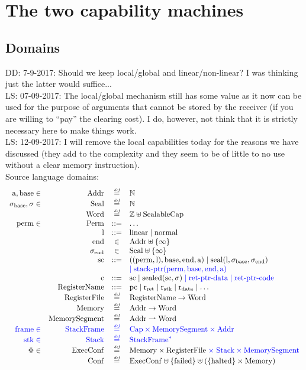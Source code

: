 \documentclass[a4paper]{article}
\newcommand\lau[1]{{\color{purple} \sf \footnotesize {LS: #1}}\\}
\newcommand\dominique[1]{{\color{purple} \sf \footnotesize {DD: #1}}\\}
\newcommand{\defeq}{\stackrel{\textit{\tiny{def}}}{=}}
\newcommand{\defbnf}{::=}
\newcommand{\fun}{\rightarrow}
\newcommand{\parfun}{\rightharpoonup}
\newcommand{\sourcecolor}[1]{\color{blue}}
\newcommand{\src}[1]{{\sourcecolor{} #1}}
\newcommand{\nats}{\mathbb{N}}
\newcommand{\ints}{\mathbb{Z}}
\newcommand{\shareddom}[1]{\mathrm{#1}}
\newcommand{\RegName}{\shareddom{RegisterName}}
\newcommand{\Addr}{\shareddom{Addr}}
\newcommand{\Seal}{\shareddom{Seal}}
\newcommand{\Perm}{\shareddom{Perm}}
\newcommand{\Caps}{\shareddom{Cap}}
\newcommand{\SealableCaps}{\shareddom{SealableCap}}
\newcommand{\Word}{\shareddom{Word}}
\newcommand{\Mem}{\shareddom{Memory}}
\newcommand{\Reg}{\shareddom{RegisterFile}}
\newcommand{\Conf}{\shareddom{Conf}}
\newcommand{\ExecConf}{\shareddom{ExecConf}}
\newcommand{\MemSeg}{\shareddom{MemorySegment}}
\newcommand{\StkFrame}{\shareddom{StackFrame}}
\newcommand{\Stack}{\shareddom{Stack}}
\newcommand{\scbnf}{\shareddom{sc}}
\newcommand{\cbnf}{\shareddom{c}}
\newcommand{\permbnf}{\shareddom{perm}}
\newcommand{\addrbnf}{\shareddom{a}}
\newcommand{\basebnf}{\shareddom{base}}
\newcommand{\aendbnf}{\shareddom{end}}
\newcommand{\linbnf}{\shareddom{l}}
\newcommand{\sealbasebnf}{\sigma_\shareddom{base}}
\newcommand{\sealendbnf}{\sigma_\shareddom{end}}
\newcommand{\sstk}{\shareddom{stk}}
\newcommand{\sstkframe}{\shareddom{frame}}
\newcommand{\stkptr}[1]{\mathrm{stack\text{-}ptr}(#1)}
\newcommand{\retptrd}{\mathrm{ret\text{-}ptr\text{-}data}}
\newcommand{\retptrc}{\mathrm{ret\text{-}ptr\text{-}code}}
\newcommand{\seal}[1]{\shareddom{seal}(#1)}
\newcommand{\sealed}[1]{\shareddom{sealed}(#1)}
\newcommand{\failed}{\mathrm{failed}}
\newcommand{\halted}{\mathrm{halted}}
\newcommand{\pcreg}{\mathrm{pc}}
\newcommand{\rstk}{\mathrm{r}_\mathrm{stk}}
\newcommand{\rO}{\mathrm{r}_\mathrm{ret}}
\newcommand{\rret}{\rO}
\newcommand{\rdata}{\mathrm{r}_\mathrm{data}}
\newcommand{\plainlinearity}[1]{\mathrm{#1}}
\newcommand{\linear}{\plainlinearity{linear}}
\newcommand{\normal}{\plainlinearity{normal}}
\begin{document}
\section{The two capability machines}
\subsection{Domains}
\label{sec:domains}

\dominique{7-9-2017: Should we keep local/global and linear/non-linear?  I was thinking just the latter would suffice...}
\lau{07-09-2017: The local/global mechanism still has some value as it now can be used for the purpose of arguments that cannot be stored by the receiver (if you are willing to ``pay'' the clearing cost). I do, however, not think that it is strictly necessary here to make things work.}
\lau{12-09-2017: I will remove the local capabilities today for the reasons we have discussed (they add to the complexity and they seem to be of little to no use without a clear memory instruction).}
Source language domains:
\[
  \begin{array}{rrcl}
   \addrbnf,\basebnf \in & \Addr & \defeq & \nats \\
    \sealbasebnf, \sigma \in & \Seal & \defeq & \nats \\
    &\Word & \defeq & \ints \uplus \SealableCaps\\
    \permbnf \in& \Perm & \defbnf & \dots \\
    &\linbnf & \defbnf & \linear \mid \normal \\
    &\aendbnf & \in & \Addr \uplus \{\infty \} \\
    &\sealendbnf & \in & \Seal \uplus \{\infty \} \\
    &\scbnf &\defbnf & ((\permbnf,\linbnf),\basebnf,\aendbnf,\addrbnf) \mid \seal{\linbnf,\sealbasebnf,\sealendbnf}\\
    & & & {\sourcecolor{} \mid \stkptr{\permbnf,\basebnf,\aendbnf,\addrbnf}}\\ 
    &\cbnf & \defbnf &  \scbnf \mid \sealed{\scbnf,\sigma}{\sourcecolor{} \; \mid \retptrd \mid \retptrc}\\ 
    &\RegName & \defbnf &\pcreg \mid \rret \mid \rstk \mid \rdata \mid \dots \\
    &\Reg & \defeq & \RegName \fun \Word\\
    &\Mem & \defeq & \Addr \fun \Word \\
    &\MemSeg & \defeq & \Addr \parfun \Word \\
    {\sourcecolor{} \sstkframe \in} & {\sourcecolor{} \StkFrame} & {\sourcecolor{} \defeq} & {\sourcecolor{} \Caps \times \MemSeg \times \Addr}\\
    \src{\sstk \in}& \src{ \Stack} & \src{ \defeq} & \src{ \StkFrame^*} \\
    \Phi \in & \ExecConf & \defeq & \Mem \times \Reg {\sourcecolor{} \; \times \; \Stack \times \MemSeg }\\
    &\Conf & \defeq & \ExecConf \uplus \{\failed\} \uplus (\{\halted\} \times \Mem)
  \end{array}
\]
\end{document}
